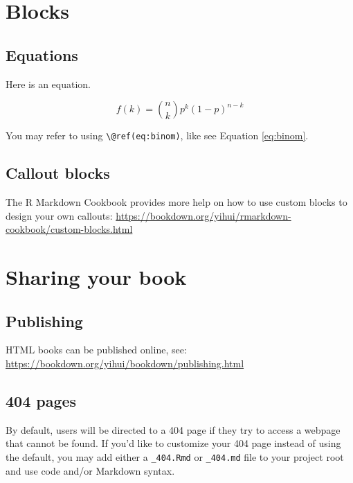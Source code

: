 \documentclass[12pt, oneside, openright]{byuthesis}
\begin{document}
\hypertarget{blocks}{%
\chapter{Blocks}\label{blocks}}

\hypertarget{equations}{%
\section{Equations}\label{equations}}

Here is an equation.

\begin{equation} 
  f\left(k\right) = \binom{n}{k} p^k\left(1-p\right)^{n-k}
  \label{eq:binom}
\end{equation}

You may refer to using \texttt{\textbackslash{}@ref(eq:binom)}, like see Equation \eqref{eq:binom}.

\hypertarget{callout-blocks}{%
\section{Callout blocks}\label{callout-blocks}}

The R Markdown Cookbook provides more help on how to use custom blocks to design your own callouts: \url{https://bookdown.org/yihui/rmarkdown-cookbook/custom-blocks.html}

\hypertarget{sharing-your-book}{%
\chapter{Sharing your book}\label{sharing-your-book}}

\hypertarget{publishing}{%
\section{Publishing}\label{publishing}}

HTML books can be published online, see: \url{https://bookdown.org/yihui/bookdown/publishing.html}

\hypertarget{pages}{%
\section{404 pages}\label{pages}}

By default, users will be directed to a 404 page if they try to access a webpage that cannot be found. If you'd like to customize your 404 page instead of using the default, you may add either a \texttt{\_404.Rmd} or \texttt{\_404.md} file to your project root and use code and/or Markdown syntax.
\end{document}
